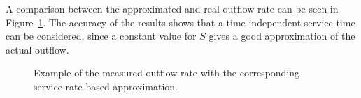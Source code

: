 A comparison between the approximated and real outflow rate can be seen in Figure~\ref{fig:outflow_approximation}. The accuracy of the results shows that a time-independent service time can be considered, since a constant value for \( S \) gives a good approximation of the actual outflow.

\begin{figure}
  \begin{center}
  \end{center}
  \caption{Example of the measured outflow rate with the corresponding service-rate-based approximation.}
  \label{fig:outflow_approximation}
\end{figure}

\medskip
\clearpage